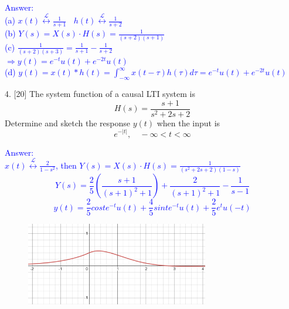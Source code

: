 \documentclass[12pt,a4paper]{article}
\begin{document}
\begin{tcolorbox}
\normalsize
\textcolor{blue}{Answer:\\
(a) $x(t)\stackrel{\mathcal{L}}{\longleftrightarrow}\frac{1}{s+1}~~~~h(t)\stackrel{\mathcal{L}}{\longleftrightarrow}\frac{1}{s+2}$\\
(b) $Y(s)=X(s)\cdot H(s)=\frac{1}{(s+2)(s+1)}$\\
(c) $\frac{1}{(s+2)(s+3)}=\frac{1}{s+1}-\frac{1}{s+2}$\\
$\Rightarrow y(t)=e^{-t}u(t)+e^{-2t}u(t)$\\
(d) $y(t)=x(t)*h(t)=\int_{-\infty}^\infty x(t-\tau)h(\tau)d\tau=e^{-t}u(t)+e^{-2t}u(t)$
}
\end{tcolorbox}

\begin{tcolorbox}[colback = white]
4. [20] The system function of a causal LTI system is
$$
H(s)=\frac{s+1}{s^{2}+2s+2}
$$
Determine and sketch the response $y(t)$ when the input is
$$
e^{-|t|}, \quad-\infty<t<\infty
$$
\end{tcolorbox}

\begin{tcolorbox}
\normalsize
\textcolor{blue}{Answer:\\
$x(t)\stackrel{\mathcal{L}}{\longleftrightarrow}\frac{2}{1-s^2}$, then $Y(s)=X(s)\cdot H(s)=\frac{1}{(s^2+2s+2)(1-s)}$\\
$$Y(s)=\frac{2}{5}(\frac{s+1}{(s+1)^2+1})+\frac{2}{(s+1)^2+1}-\frac{1}{s-1}$$
$$y(t)=\frac{2}{5}coste^{-t}u(t)+\frac{4}{5}sinte^{-t}u(t)+\frac{2}{5}e^tu(-t)$$
\begin{figure}[H]
    \centering
    \includegraphics[width=8cm]{q4.png}
\end{figure}
}
\end{tcolorbox}
\end{document}
